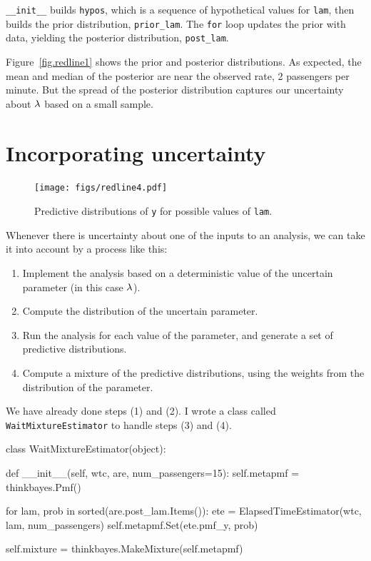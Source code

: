 \documentclass[12pt]{book}
\theoremstyle{exercise}
\newcommand{\py}[1]{{\tt #1}}%
\begin{document}
\verb"__init__" builds
\py{hypos}, which is a sequence of hypothetical values for \py{lam},
then builds the prior distribution, \verb"prior_lam".
The \py{for} loop updates the prior with data, yielding the posterior
distribution, \verb"post_lam".

Figure~\ref{fig.redline1} shows
the prior and posterior distributions.  As expected, the mean and
median of the posterior are near the observed rate, 2 passengers per
minute.  But the spread of the posterior distribution captures our
uncertainty about $\mathtt{\lambda}$ based on a small sample.


\section{Incorporating uncertainty}

\begin{figure}
\centerline{\texttt{[image: figs/redline4.pdf]}}
\caption{Predictive distributions of \py{y} for possible values
  of \py{lam}. }
\label{fig.redline4}
\end{figure}

Whenever there is uncertainty about one of the inputs to an analysis,
we can take it into account by a process like this:

\begin{enumerate}

\item Implement the analysis based on a deterministic value of the
  uncertain parameter (in this case $\mathtt{\lambda}$).

\item Compute the distribution of the uncertain parameter.

\item Run the analysis for each value of the parameter, and generate a
  set of predictive distributions.

\item Compute a mixture of the predictive distributions, using the
  weights from the distribution of the parameter.

\end{enumerate}

We have already done steps (1) and (2).  I wrote a class
called \py{WaitMixtureEstimator} to handle steps (3) and (4).

\begin{code}
class WaitMixtureEstimator(object):

    def __init__(self, wtc, are, num_passengers=15):
        self.metapmf = thinkbayes.Pmf()

        for lam, prob in sorted(are.post_lam.Items()):
            ete = ElapsedTimeEstimator(wtc, lam, num_passengers)
            self.metapmf.Set(ete.pmf_y, prob)

        self.mixture = thinkbayes.MakeMixture(self.metapmf)
\end{code}
\end{document}
